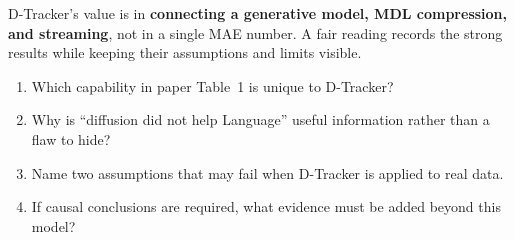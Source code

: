 \begin{keypoint}
D-Tracker's value is in \textbf{connecting a generative model, MDL compression, and streaming}, not in
a single MAE number. A fair reading records the strong results while keeping their assumptions and
limits visible.
\end{keypoint}

\begin{selfcheck}
\begin{enumerate}
  \item Which capability in paper Table~1 is unique to D-Tracker?
  \item Why is ``diffusion did not help Language'' useful information rather than a flaw to hide?
  \item Name two assumptions that may fail when D-Tracker is applied to real data.
  \item If causal conclusions are required, what evidence must be added beyond this model?
\end{enumerate}
\end{selfcheck}
